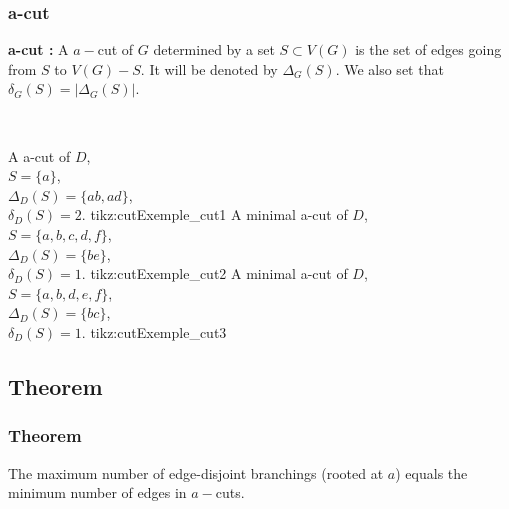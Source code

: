 \documentclass[8pt]{beamer}
\begin{document}
\begin{frame}
\frametitle{a-cut}

\textbf{a-cut :}
A $a-$cut of $G$ determined by a set $S \subset V(G)$ is the set of
edges going from $S$ to $V(G) - S$. 
It will be denoted by $\Delta_G(S)$.
We also set that $\delta_G(S) = |\Delta_G(S)|$.

~

\threesplitpage
{
    {A a-cut of $D$,\\ $S = \{a\}$,\\ $\Delta_D(S)=\{ab, ad\}$,\\ $\delta_D(S) = 2$.}
    {tikz:cutExemple_cut1}
}{
    {A minimal a-cut of $D$,\\ $S = \{a, b, c, d, f\}$,\\ $\Delta_D(S)=\{be\}$,\\ $\delta_D(S) = 1$.}
    {tikz:cutExemple_cut2}
}{
    {A minimal a-cut of $D$,\\ $S = \{a, b, d, e, f\}$,\\ $\Delta_D(S)=\{bc\}$,\\ $\delta_D(S) = 1$.}
    {tikz:cutExemple_cut3}
}
\end{frame}

\subsection{Theorem}
\begin{frame}
\frametitle{Theorem}

\begin{edmonds_theorem}[Edmonds]
The maximum number of edge-disjoint branchings (rooted at $a$) 
equals the minimum number of edges in $a-$cuts.
\end{edmonds_theorem}
\end{frame}

\end{document}
